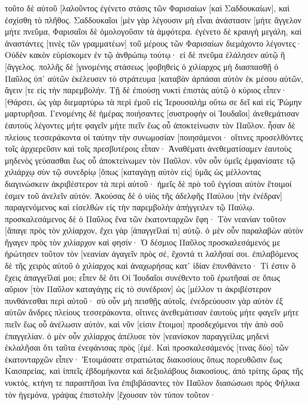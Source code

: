 τοῦτο δὲ αὐτοῦ [λαλοῦντος ἐγένετο στάσις τῶν Φαρισαίων [καὶ Σαδδουκαίων], καὶ ἐσχίσθη τὸ πλῆθος. 
Σαδδουκαῖοι [μὲν γὰρ λέγουσιν μὴ εἶναι ἀνάστασιν [μήτε ἄγγελον μήτε πνεῦμα, Φαρισαῖοι δὲ ὁμολογοῦσιν τὰ ἀμφότερα. 
ἐγένετο δὲ κραυγὴ μεγάλη, καὶ ἀναστάντες [τινὲς τῶν γραμματέων] τοῦ μέρους τῶν Φαρισαίων διεμάχοντο λέγοντες· Οὐδὲν κακὸν εὑρίσκομεν ἐν τῷ ἀνθρώπῳ τούτῳ· εἰ δὲ πνεῦμα ἐλάλησεν αὐτῷ ἢ [ἄγγελος. 
πολλῆς δὲ [γινομένης στάσεως [φοβηθεὶς ὁ χιλίαρχος μὴ διασπασθῇ ὁ Παῦλος ὑπ᾽ αὐτῶν ἐκέλευσεν τὸ στράτευμα [καταβὰν ἁρπάσαι αὐτὸν ἐκ μέσου αὐτῶν, ἄγειν [τε εἰς τὴν παρεμβολήν. 
Τῇ δὲ ἐπιούσῃ νυκτὶ ἐπιστὰς αὐτῷ ὁ κύριος εἶπεν· [Θάρσει, ὡς γὰρ διεμαρτύρω τὰ περὶ ἐμοῦ εἰς Ἰερουσαλὴμ οὕτω σε δεῖ καὶ εἰς Ῥώμην μαρτυρῆσαι. 
Γενομένης δὲ ἡμέρας ποιήσαντες [συστροφὴν οἱ Ἰουδαῖοι] ἀνεθεμάτισαν ἑαυτοὺς λέγοντες μήτε φαγεῖν μήτε πιεῖν ἕως οὗ ἀποκτείνωσιν τὸν Παῦλον. 
ἦσαν δὲ πλείους τεσσεράκοντα οἱ ταύτην τὴν συνωμοσίαν [ποιησάμενοι· 
οἵτινες προσελθόντες τοῖς ἀρχιερεῦσιν καὶ τοῖς πρεσβυτέροις εἶπαν· Ἀναθέματι ἀνεθεματίσαμεν ἑαυτοὺς μηδενὸς γεύσασθαι ἕως οὗ ἀποκτείνωμεν τὸν Παῦλον. 
νῦν οὖν ὑμεῖς ἐμφανίσατε τῷ χιλιάρχῳ σὺν τῷ συνεδρίῳ [ὅπως [καταγάγῃ αὐτὸν εἰς] ὑμᾶς ὡς μέλλοντας διαγινώσκειν ἀκριβέστερον τὰ περὶ αὐτοῦ· ἡμεῖς δὲ πρὸ τοῦ ἐγγίσαι αὐτὸν ἕτοιμοί ἐσμεν τοῦ ἀνελεῖν αὐτόν. 
Ἀκούσας δὲ ὁ υἱὸς τῆς ἀδελφῆς Παύλου [τὴν ἐνέδραν] παραγενόμενος καὶ εἰσελθὼν εἰς τὴν παρεμβολὴν ἀπήγγειλεν τῷ Παύλῳ. 
προσκαλεσάμενος δὲ ὁ Παῦλος ἕνα τῶν ἑκατονταρχῶν ἔφη· Τὸν νεανίαν τοῦτον [ἄπαγε πρὸς τὸν χιλίαρχον, ἔχει γὰρ [ἀπαγγεῖλαί τι] αὐτῷ. 
ὁ μὲν οὖν παραλαβὼν αὐτὸν ἤγαγεν πρὸς τὸν χιλίαρχον καὶ φησίν· Ὁ δέσμιος Παῦλος προσκαλεσάμενός με ἠρώτησεν τοῦτον τὸν [νεανίαν ἀγαγεῖν πρὸς σέ, ἔχοντά τι λαλῆσαί σοι. 
ἐπιλαβόμενος δὲ τῆς χειρὸς αὐτοῦ ὁ χιλίαρχος καὶ ἀναχωρήσας κατ᾽ ἰδίαν ἐπυνθάνετο· Τί ἐστιν ὃ ἔχεις ἀπαγγεῖλαί μοι; 
εἶπεν δὲ ὅτι Οἱ Ἰουδαῖοι συνέθεντο τοῦ ἐρωτῆσαί σε ὅπως αὔριον [τὸν Παῦλον καταγάγῃς εἰς τὸ συνέδριον] ὡς [μέλλον τι ἀκριβέστερον πυνθάνεσθαι περὶ αὐτοῦ· 
σὺ οὖν μὴ πεισθῇς αὐτοῖς, ἐνεδρεύουσιν γὰρ αὐτὸν ἐξ αὐτῶν ἄνδρες πλείους τεσσεράκοντα, οἵτινες ἀνεθεμάτισαν ἑαυτοὺς μήτε φαγεῖν μήτε πιεῖν ἕως οὗ ἀνέλωσιν αὐτόν, καὶ νῦν [εἰσιν ἕτοιμοι] προσδεχόμενοι τὴν ἀπὸ σοῦ ἐπαγγελίαν. 
ὁ μὲν οὖν χιλίαρχος ἀπέλυσε τὸν [νεανίσκον παραγγείλας μηδενὶ ἐκλαλῆσαι ὅτι ταῦτα ἐνεφάνισας πρὸς [ἐμέ. 
Καὶ προσκαλεσάμενός [τινας δύο] τῶν ἑκατονταρχῶν εἶπεν· Ἑτοιμάσατε στρατιώτας διακοσίους ὅπως πορευθῶσιν ἕως Καισαρείας, καὶ ἱππεῖς ἑβδομήκοντα καὶ δεξιολάβους διακοσίους, ἀπὸ τρίτης ὥρας τῆς νυκτός, 
κτήνη τε παραστῆσαι ἵνα ἐπιβιβάσαντες τὸν Παῦλον διασώσωσι πρὸς Φήλικα τὸν ἡγεμόνα, 
γράψας ἐπιστολὴν [ἔχουσαν τὸν τύπον τοῦτον· 
